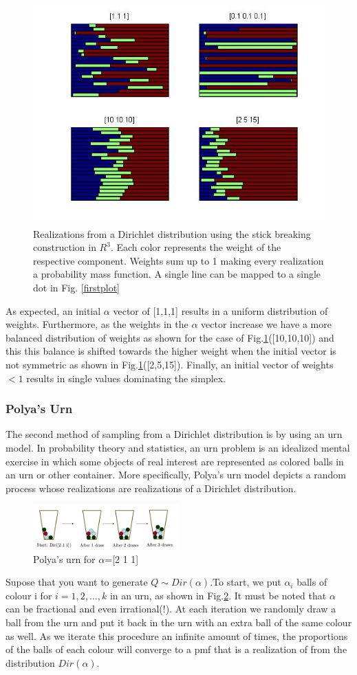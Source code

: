 \documentclass[twoside,hidelinks]{article}
\begin{document}
\begin{figure}[!h]
    \centerline{\includegraphics[width=.55\textwidth]{stickBreaking}}
    \caption{Realizations from a Dirichlet distribution using the stick breaking construction in $R^3$. Each color represents the weight of the respective component. Weights sum up to 1 making every realization a probability mass function. A single line can be mapped to a single dot in Fig. \ref{firstplot}  }
\label{stickR3}
\end{figure}


As expected, an initial $\alpha$ vector of [1,1,1] results in a uniform distribution of weights. Furthermore, as the weights in the $\alpha$ vector increase we have a more balanced distribution of weights as shown for the case of Fig.\ref{stickR3}([10,10,10]) and this this balance is shifted towards the higher weight when the initial vector is not symmetric as shown in Fig.\ref{stickR3}([2,5,15]). Finally, an initial vector of weights $<1$ results in single values dominating the simplex.
\subsubsection{Polya's Urn}

The second method of sampling from a Dirichlet distribution is by using an urn model. In probability theory and statistics, an urn problem is an idealized mental exercise in which some objects of real interest are represented as colored balls in an urn or other container. More specifically, Polya's urn model depicts a random process whose realizations are realizations of a Dirichlet distribution.
\begin{figure}[!h]
    \centerline{\includegraphics[width=0.5\textwidth]{urn}}
	\caption{Polya's urn for $\alpha$=[2 1 1] }
	\label{polysurn}
\end{figure}
Supose that you want to generate $Q \sim Dir( \alpha ) $.To start, we put $\alpha_i$ balls of colour i for $i=1,2,...,k$ in an urn, as shown in Fig.\ref{polysurn}. It must be noted that $\alpha$ can be fractional and even irrational(!). At each iteration we randomly draw a ball from the urn and put it back in the urn with an extra ball of the same colour as well. As we iterate this procedure an infinite amount of times, the proportions of the balls of each colour will converge to a pmf that is a realization of from the distribution $Dir(\alpha)$.
\end{document}
